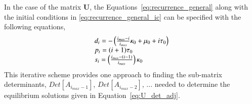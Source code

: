 \documentclass[review]{elsarticle}
\let\bs\boldsymbol
\begin{document}
In the case of the matrix $\bs{U}$, the Equations~\ref{eq:recurrence_general} along with the initial conditions in \ref{eq:recurrence_general_ic} can be specified with the following equations,
\[
\begin{array}{l}
d_{i}=-\left(\frac{i_{max}-i}{i_{max}}\kappa_0+\mu_0+i\text{\ensuremath{\tau_0}}\right)\\
p_{i}=(i+1)\tau_0\\
s_{i}=\left(\frac{i_{max}-(i-1)}{i_{max}}\right)\kappa_0
\end{array}
\]
This iterative scheme provides one approach to finding the sub-matrix determinants, $Det[A_{i_{max}-1}]$, $Det[A_{i_{max}-2}]$, $... $ needed to determine the equilibrium solutions given in Equation~\ref{eq:U_det_adj}. 



 

\end{document}
